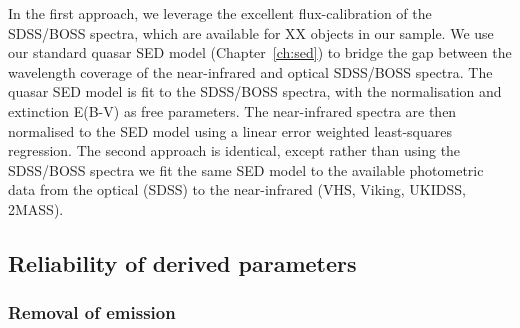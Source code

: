 In the first approach, we leverage the excellent flux-calibration of the SDSS/BOSS spectra, which are available for XX objects in our sample. 
We use our standard quasar \ac{SED} model (Chapter~\ref{ch:sed}) to bridge the gap between the wavelength coverage of the near-infrared and optical SDSS/BOSS spectra.
The quasar \ac{SED} model is fit to the SDSS/BOSS spectra, with the normalisation and extinction E(B-V) as free parameters. 
The near-infrared spectra are then normalised to the \ac{SED} model using a linear error weighted least-squares regression.  
The second approach is identical, except rather than using the SDSS/BOSS spectra we fit the same \ac{SED} model to the available photometric data from the optical (SDSS) to the near-infrared (VHS, Viking, UKIDSS, 2MASS). 

\subsection{Reliability of derived parameters}

\subsubsection{Removal of  emission}

